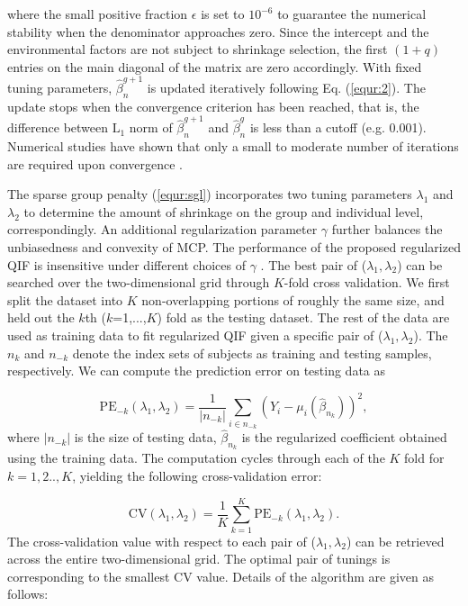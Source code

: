 \documentclass[12pt]{article}
\begin{document}
where the small positive fraction $\epsilon$ is set to $10^{-6}$ to guarantee the numerical stability when the denominator approaches zero. Since the intercept and the environmental factors are not subject to shrinkage selection, the first $(1 + q)$ entries on the main diagonal of the matrix are zero accordingly. With fixed tuning parameters, $\hat{\beta}_n^{g+1}$ is updated iteratively following Eq. (\ref{equr:2}). The update stops when the convergence criterion has been reached, that is, the difference between $\text{L}_1$ norm of $\hat{\beta}_n^{g+1}$ and $\hat{\beta}_n^{g}$ is less than a cutoff (e.g. 0.001). Numerical studies have shown that only a small to moderate number of iterations are required upon convergence \cite{zhou2022sparse}.   

The sparse group penalty (\ref{equr:sgl}) incorporates two tuning parameters $\lambda_1$ and $\lambda_2$ to determine the amount of shrinkage on the group and individual level, correspondingly. An additional regularization parameter $\gamma$ further balances the unbiasedness and convexity of MCP. The performance of the proposed regularized QIF is insensitive under different choices of $\gamma$ \cite{zhou2022sparse}. The best pair of ($\lambda_1, \lambda_2$) can be searched over the two-dimensional grid through $K$-fold cross validation. We first split the dataset into $K$ non-overlapping portions of roughly the same size, and held out the $k$th ($k$=1,...,$K$) fold as the testing dataset. The rest of the data are used as training data to fit regularized QIF given a specific pair of ($\lambda_1, \lambda_2$). The $n_{k}$ and $n_{-k}$ denote the index sets of subjects as training and testing samples, respectively. We can compute the prediction error on testing data as         

\begin{equation*}
\text{PE}_{-k}(\lambda_1, \lambda_2)=\frac{1}{|n_{-k}|}\sum_{i \in n_{-k}}(Y_i-\mu_i(\hat{\beta}_{n_{k}}))^2,
\end{equation*}
where  $|n_{-k}|$ is the size of testing data, $\hat{\beta}_{n_{k}}$ is the regularized coefficient obtained using the training data. The computation cycles through each of the $K$ fold for $k=1,2..,K$, yielding the following cross-validation error:

\begin{equation}\label{equr:cv}
\text{CV}(\lambda_1, \lambda_2)=\frac{1}{K}\sum_{k =1}^{K}\text{PE}_{-k}(\lambda_1, \lambda_2).
\end{equation}
The cross-validation value with respect to each pair of ($\lambda_1, \lambda_2$) can be retrieved across the entire two-dimensional grid. The optimal pair of tunings is corresponding to the smallest CV value. Details of the algorithm are given as follows:
\end{document}
